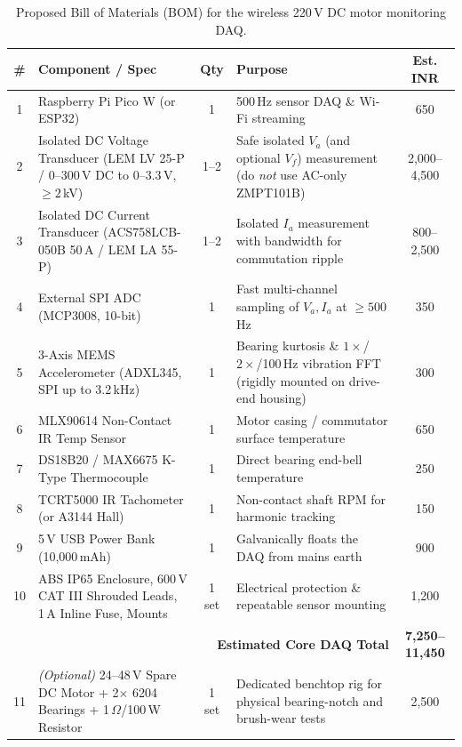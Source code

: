 \documentclass[11pt,a4paper]{article}
\begin{document}
\begin{table}[H]
\centering
\small
\setlength{\tabcolsep}{4pt}
\caption{Proposed Bill of Materials (BOM) for the wireless 220\,V DC motor monitoring DAQ.}
\label{tab:bom}
\renewcommand{\arraystretch}{1.15}
\begin{tabular}{@{}cp{}cp{}c@{}}
\toprule
\textbf{\#} & \textbf{Component / Spec} & \textbf{Qty} & \textbf{Purpose} & \textbf{Est. INR} \\
\midrule
1 & Raspberry Pi Pico W (or ESP32) & 1 & 500\,Hz sensor DAQ \& Wi-Fi streaming & 650 \\
2 & Isolated DC Voltage Transducer (LEM LV 25-P / 0--300\,V DC to 0--3.3\,V, $\ge 2$\,kV) & 1--2 & Safe isolated $V_a$ (and optional $V_f$) measurement (do \emph{not} use AC-only ZMPT101B) & 2,000--4,500 \\
3 & Isolated DC Current Transducer (ACS758LCB-050B 50\,A / LEM LA 55-P) & 1--2 & Isolated $I_a$ measurement with bandwidth for commutation ripple & 800--2,500 \\
4 & External SPI ADC (MCP3008, 10-bit) & 1 & Fast multi-channel sampling of $V_a, I_a$ at $\ge 500$\,Hz & 350 \\
5 & 3-Axis MEMS Accelerometer (ADXL345, SPI up to 3.2\,kHz) & 1 & Bearing kurtosis \& $1\times$/$2\times$/100\,Hz vibration FFT (rigidly mounted on drive-end housing) & 300 \\
6 & MLX90614 Non-Contact IR Temp Sensor & 1 & Motor casing / commutator surface temperature & 650 \\
7 & DS18B20 / MAX6675 K-Type Thermocouple & 1 & Direct bearing end-bell temperature & 250 \\
8 & TCRT5000 IR Tachometer (or A3144 Hall) & 1 & Non-contact shaft RPM for harmonic tracking & 150 \\
9 & 5\,V USB Power Bank (10,000\,mAh) & 1 & Galvanically floats the DAQ from mains earth & 900 \\
10 & ABS IP65 Enclosure, 600\,V CAT III Shrouded Leads, 1\,A Inline Fuse, Mounts & 1 set & Electrical protection \& repeatable sensor mounting & 1,200 \\
\midrule
\multicolumn{4}{r}{\textbf{Estimated Core DAQ Total}} & \textbf{7,250--11,450} \\
\midrule
11 & \emph{(Optional)} 24--48\,V Spare DC Motor + 2$\times$ 6204 Bearings + 1\,$\Omega$/100\,W Resistor & 1 set & Dedicated benchtop rig for physical bearing-notch and brush-wear tests & 2,500 \\
\bottomrule
\end{tabular}
\end{table}
\end{document}
